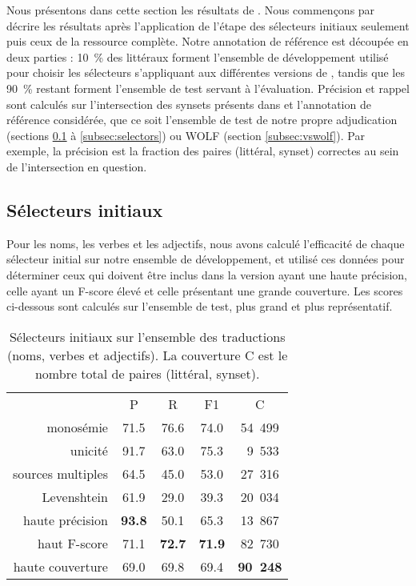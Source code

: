 
Nous présentons dans cette section les résultats de \newjaws{}. Nous commençons par décrire les résultats après l'application de l'étape des sélecteurs initiaux seulement puis ceux de la ressource complète. Notre annotation de référence est découpée en deux parties : 10~\% des littéraux forment l'ensemble de développement utilisé pour choisir les sélecteurs s'appliquant aux différentes versions de \newjaws{}, tandis que les 90~\% restant forment l'ensemble de test servant à l'évaluation. Précision et rappel sont calculés sur l'intersection des synsets présents dans \newjaws{} et l'annotation de référence considérée, que ce soit l'ensemble de test de notre propre adjudication (sections \ref{subsec:heuristics} à \ref{subsec:selectors}) ou WOLF (section \ref{subsec:vswolf}). Par exemple, la précision est la fraction des paires (littéral, synset) correctes au sein de l'intersection en question.

\subsection{Sélecteurs initiaux}
\label{subsec:heuristics}

Pour les noms, les verbes et les adjectifs, nous avons calculé l'efficacité de chaque sélecteur initial sur notre ensemble de développement, et utilisé ces données pour déterminer ceux qui doivent être inclus dans la version ayant une haute précision, celle ayant un F-score élevé et celle présentant une grande couverture. Les scores ci-dessous sont calculés sur l'ensemble de test, plus grand et plus représentatif.

\let\b\textbf

\begin{table}[ht]
\centering
\begin{tabular}{rcccc}
  \toprule
                    & P & R & F1 & C \\
  monosémie         & 71.5 & 76.6 & 74.0 & 54~499 \\
  unicité           & 91.7 & 63.0 & 75.3 & ~9~533 \\
  sources multiples & 64.5 & 45.0 & 53.0 & 27~316 \\
  Levenshtein       & 61.9 & 29.0 & 39.3 & 20~034 \\
  \midrule
  haute précision   & \b{93.8} & 50.1     & 65.3     & 13~867 \\
  haut F-score      & 71.1     & \b{72.7} & \b{71.9} & 82~730 \\
  haute couverture  & 69.0     & 69.8     & 69.4     & \b{90~248} \\
  \bottomrule
\end{tabular}
\caption{\protect\centering\label{table:heuristics}Sélecteurs initiaux sur l'ensemble des traductions (noms, verbes et adjectifs). La couverture C est le nombre total de paires (littéral, synset).}
\end{table}

